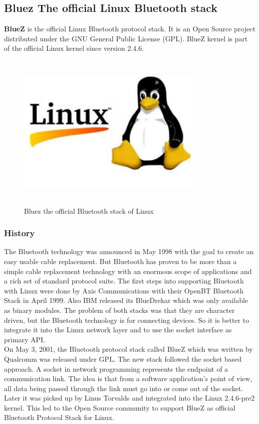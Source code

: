 \subsection{Bluez The official Linux Bluetooth stack}
\textbf{BlueZ} is the official Linux Bluetooth protocol stack. It is an Open Source project distributed under the GNU General Public License (GPL). BlueZ kernel is part of the official Linux kernel since version 2.4.6.
\begin{figure}[ht]
	\centering
	\includegraphics[width=3.5in, height=3in]{images/bluez_intro.png}
	\caption{Bluez the official Bluetooth stack of Linux}
\end{figure}
\subsubsection{History}
The Bluetooth technology was announced in May 1998 with the goal to create an easy usable cable replacement. But Bluetooth has proven to be more than a simple cable replacement technology with an enormous scope of applications and a rich set of standard protocol suite. The first steps into supporting Bluetooth with Linux were done by Axis Communications with their OpenBT Bluetooth Stack in April 1999. Also IBM released its BlueDrekar which was only available as binary modules. The problem of both stacks was that they are character driven, but the Bluetooth technology is for connecting devices. So it is better to integrate it into the Linux network layer and to use the socket interface as primary API.\\
On May 3, 2001, the Bluetooth protocol stack called BlueZ which was written by Qualcomm was released under GPL. The new stack followed the socket based approach. A socket in network programming represents the endpoint of a communication link. The idea is that from a software application's point of view, all data being passed through the link must go into or come out of the socket. Later it was picked up by Linus Torvalds and integrated into the Linux 2.4.6-pre2 kernel. This led to the Open Source community to support BlueZ as official Bluetooth Protocol Stack for Linux.
